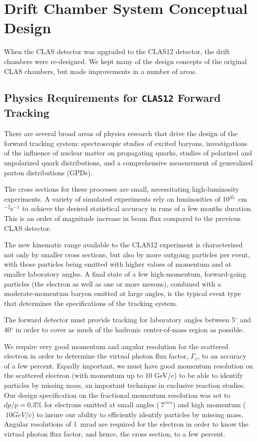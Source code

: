 \section{Drift Chamber System Conceptual Design}

When the CLAS detector was upgraded to the CLAS12 detector, the
drift chambers were re-designed.  We kept many of the design concepts
of the original CLAS chambers, but made improvements in a number
of areas.

\subsection{Physics Requirements for {\tt CLAS12} Forward Tracking}

There are several broad areas of physics research that drive 
the design of the forward tracking system: 
spectroscopic studies of excited baryons, investigations of 
the influence of nuclear matter on propagating quarks, studies of polarized 
and unpolarized quark distributions, and a comprehensive measurement of 
generalized parton distributions (GPDs). 

The cross sections for these processes are small, necessitating high-luminosity 
experiments.  A variety of simulated experiments rely on luminosities of 
10$^{35}$~cm$^{-2}$s$^{-1}$ to achieve the desired statistical accuracy in 
runs of a few months duration.  This is an order of magnitude increase
in beam flux compared to the previous CLAS detector.  

The new kinematic range available to the CLAS12 experiment is
characterized not only by smaller cross sections, but also by more outgoing 
particles per event, with those particles being emitted with higher values 
of momentum and at smaller laboratory angles.  
A final state of a few high-momentum, forward-going particles (the electron as well as one 
or more mesons), combined with a moderate-momentum baryon emitted at large 
angles, is the typical event type that determines the specifications of the 
tracking system. 

The forward detector must provide tracking for laboratory angles between 5$^\circ$ 
and 40$^\circ$ in order to cover as much of 
the hadronic center-of-mass region as possible.  

We require very good momentum 
and angular resolution for the scattered electron in order to determine the 
virtual photon flux factor, $\Gamma_v$, to an accuracy of a few percent.
Equally important, we must have good momentum resolution on the scattered
electron (with momentum up to 10 GeV/c) to be able to identify particles
by missing mass, an important technique in exclusive reaction studies.
Our design specification on the fractional momentum resolution was set to
$dp/p = 0.3\%$ for electrons emitted at small angles ($~ 7^{circ}$) and high
momentum ($~ 10 GeV/c$) to insure our ability to efficiently identify
particles by missing mass.  Angular resolutions of 1~mrad are required for the electron 
in order to know the virtual photon flux factor, and hence, the cross section, 
to a few percent. 


